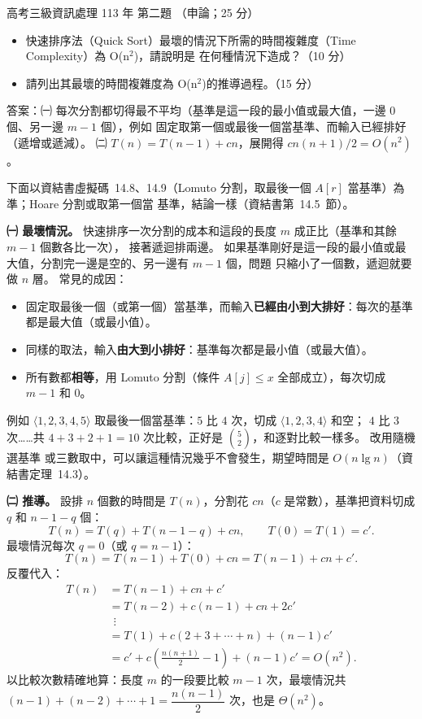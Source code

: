 \begin{pastexam}[label={px:gk3-113-ds-02}]{高考三級資訊處理 113 年 第二題}
（申論；25 分）

\begin{itemize}[leftmargin=2.2em]
\item[㈠] 快速排序法（Quick Sort）最壞的情況下所需的時間複雜度（Time Complexity）為 O(n$^2$)，請說明是
在何種情況下造成？（10 分）
\item[㈡] 請列出其最壞的時間複雜度為 O(n$^2$)的推導過程。（15 分）
\end{itemize}
\end{pastexam}

\begin{pastsoln}
答案：㈠ 每次分割都切得最不平均（基準是這一段的最小值或最大值，一邊 $0$ 個、另一邊 $m - 1$ 個），例如
固定取第一個或最後一個當基準、而輸入已經排好（遞增或遞減）。 ㈡ $T(n) = T(n-1) + cn$，展開得
$cn(n+1)/2 = O(n^2)$。

下面以資結書虛擬碼~14.8、14.9（Lomuto 分割，取最後一個 $A[r]$ 當基準）為準；Hoare 分割或取第一個當
基準，結論一樣（資結書第~14.5~節）。

\textbf{㈠ 最壞情況。} 快速排序一次分割的成本和這段的長度 $m$ 成正比（基準和其餘 $m - 1$ 個數各比一次），
接著遞迴排兩邊。 如果基準剛好是這一段的最小值或最大值，分割完一邊是空的、另一邊有 $m - 1$ 個，問題
只縮小了一個數，遞迴就要做 $n$ 層。 常見的成因：
\begin{itemize}
\item 固定取最後一個（或第一個）當基準，而輸入\textbf{已經由小到大排好}：每次的基準都是最大值（或最小值）。
\item 同樣的取法，輸入\textbf{由大到小排好}：基準每次都是最小值（或最大值）。
\item 所有數都\textbf{相等}，用 Lomuto 分割（條件 $A[j] \le x$ 全部成立），每次切成 $m - 1$ 和 $0$。
\end{itemize}
例如 $\langle 1, 2, 3, 4, 5\rangle$ 取最後一個當基準：$5$ 比 $4$ 次，切成 $\langle 1, 2, 3, 4\rangle$ 和空；
$4$ 比 $3$ 次……共 $4 + 3 + 2 + 1 = 10$ 次比較，正好是 $\binom{5}{2}$，和逐對比較一樣多。 改用隨機選基準
或三數取中，可以讓這種情況幾乎不會發生，期望時間是 $O(n \lg n)$（資結書定理~14.3）。

\textbf{㈡ 推導。} 設排 $n$ 個數的時間是 $T(n)$，分割花 $cn$（$c$ 是常數），基準把資料切成 $q$ 和
$n - 1 - q$ 個：
\[
T(n) = T(q) + T(n - 1 - q) + cn, \qquad T(0) = T(1) = c'.
\]
最壞情況每次 $q = 0$（或 $q = n - 1$）：
\[
T(n) = T(n - 1) + T(0) + cn = T(n - 1) + cn + c'.
\]
反覆代入：
\begin{align*}
T(n) &= T(n-1) + cn + c' \\
     &= T(n-2) + c(n-1) + cn + 2c' \\
     &\ \ \vdots \\
     &= T(1) + c(2 + 3 + \cdots + n) + (n-1)c' \\
     &= c' + c\left(\frac{n(n+1)}{2} - 1\right) + (n - 1)c' = O(n^2).
\end{align*}
以比較次數精確地算：長度 $m$ 的一段要比較 $m - 1$ 次，最壞情況共
$(n-1) + (n-2) + \cdots + 1 = \dfrac{n(n-1)}{2}$ 次，也是 $\Theta(n^2)$。


\end{pastsoln}
